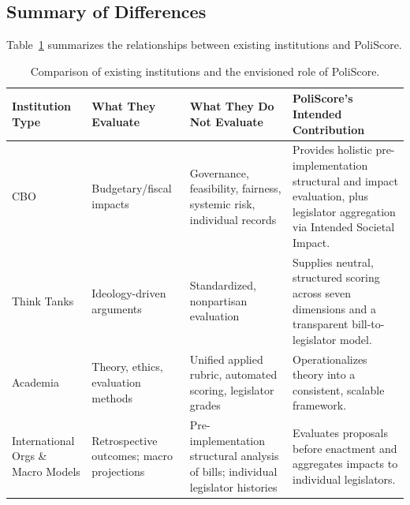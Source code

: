 \documentclass[12pt]{article}
\begin{document}
\subsection{Summary of Differences}

Table~\ref{tab:institutions} summarizes the relationships between existing institutions and PoliScore.

\begin{table}[h]
    \centering
    \begin{tabular}{>{\raggedright\arraybackslash}p{}%
                    >{\raggedright\arraybackslash}p{}%
                    >{\raggedright\arraybackslash}p{}%
                    >{\raggedright\arraybackslash}p{}}
        \toprule
        \textbf{Institution Type} & \textbf{What They Evaluate} & \textbf{What They Do Not Evaluate} & \textbf{PoliScore’s Intended Contribution} \\
        \midrule
        CBO &
        Budgetary/fiscal impacts &
        Governance, feasibility, fairness, systemic risk, individual records &
        Provides holistic pre-implementation structural and impact evaluation, plus legislator aggregation via Intended Societal Impact. \\
        \midrule
        Think Tanks &
        Ideology-driven arguments &
        Standardized, nonpartisan evaluation &
        Supplies neutral, structured scoring across seven dimensions and a transparent bill-to-legislator model. \\
        \midrule
        Academia &
        Theory, ethics, evaluation methods &
        Unified applied rubric, automated scoring, legislator grades &
        Operationalizes theory into a consistent, scalable framework. \\
        \midrule
        International Orgs \& Macro Models &
        Retrospective outcomes; macro projections &
        Pre-implementation structural analysis of bills; individual legislator histories &
        Evaluates proposals before enactment and aggregates impacts to individual legislators. \\
        \bottomrule
    \end{tabular}
    \caption{Comparison of existing institutions and the envisioned role of PoliScore.}
    \label{tab:institutions}
\end{table}

\end{document}

